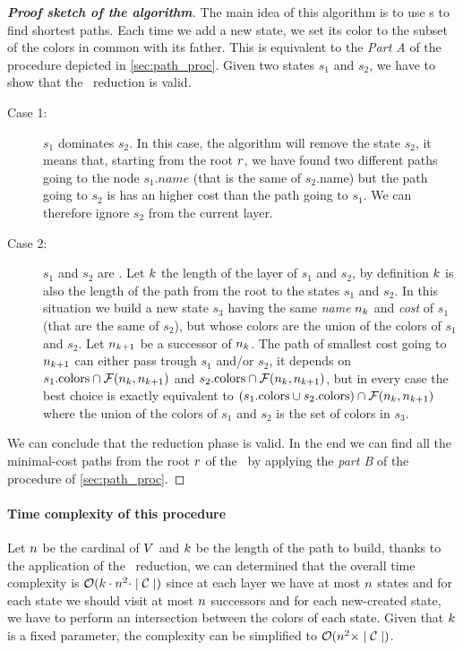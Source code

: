 \begin{proof}[\normalfont\textbf{Proof sketch of the algorithm}]
  The main idea of this algorithm is to use \mdd s to find shortest paths. Each time we add a new state, we set its color to the subset of the colors in common with its father. This is equivalent to the \textit{Part A} of the procedure depicted in \cref{sec:path_proc}. Given two states $s_1$ and $s_2$, we have to show that the \mdd\ reduction is valid.
  \begin{description}
    \item[Case 1:] $s_1$ dominates $s_2$. In this case, the algorithm will remove the state $s_2$, it means that, starting from the root $r$, we have found two different paths going to the node $s_1\textit{.name}$ (that is the same of $s_2\text{.name}$) but the path going to $s_2$ is has an higher cost than the path going to $s_1$. We can therefore ignore $s_2$ from the current layer.
    \item[Case 2:] $s_1$ and $s_2$ are \compatibleState. Let $k$ the length of the layer of $s_1$ and $s_2$, by definition $k$ is also the length of the path from the root to the states $s_1$ and $s_2$. In this situation we build a new state $s_3$ having the same \textit{name} $n_k$ and \textit{cost} of $s_1$ (that are the same of $s_2$), but whose colors are the union of the colors of $s_1$ and $s_2$. Let $n_{k+1}$ be a successor of $n_k$. The path of smallest cost going to $n_{k+1}$ can either pass trough $s_1$ and/or $s_2$, it depends on $s_1\text{.colors} \cap \mathcal{F}(n_k, n_{k+1})$ and $s_2\text{.colors} \cap \mathcal{F}(n_k, n_{k+1})$, but in every case the best choice is exactly equivalent to $(s_1\text{.colors} \cup s_2\text{.colors}) \cap \mathcal{F}(n_k, n_{k+1})$ where the union of the colors of $s_1$ and $s_2$ is the set of colors in $s_3$.
  \end{description}
  We can conclude that the reduction phase is valid. In the end we can find all the minimal-cost paths from the root $r$ of the \mdd\ by applying the \textit{part B} of the procedure of \cref{sec:path_proc}.
\end{proof}

\paragraph{Time complexity of this procedure} Let $n$ be the cardinal of $V$ and $k$ be the length of the path to build, thanks to the application of the \mdd\ reduction, we can determined that the overall time complexity is $\mathcal{O}(k \cdot n^2 \cdot \mid \mathcal{C} \mid)$ since at each layer we have at most $n$ states and for each state we should visit at most $n$ successors and for each new-created state, we have to perform an intersection between the colors of each state. Given that $k$ is a fixed parameter, the complexity can be simplified to $\mathcal{O}(n^2 \times \mid \mathcal{C} \mid)$.

